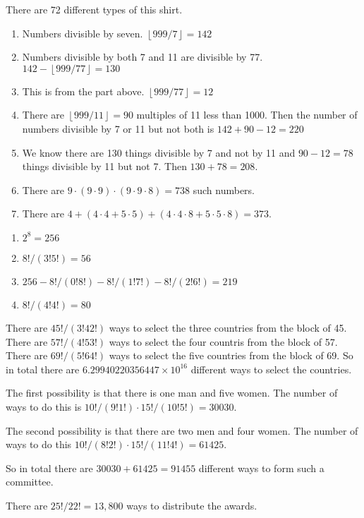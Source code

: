\documentclass[paper=a4, fontsize=11pt]{jhwhw} %
\begin{document}
\solution
There are 72 different types of this shirt.

\solution
\begin{enumerate}
    \item 
        Numbers divisible by seven. $\left \lfloor{999/7}\right \rfloor = 142$
    \item 
        Numbers divisible by both 7 and 11 are divisible by 77. $142 - \left \lfloor{999/77}\right \rfloor = 130$
    \item 
        This is from the part above. $\left \lfloor{999/77}\right \rfloor = 12$
    \item 
        There are $\left \lfloor{999/11}\right \rfloor = 90$ multiples of 11 less than 1000. Then the number of numbers divisible by 7 or 11 but not both is $142 + 90 - 12 = 220$
    \item 
        We know there are 130 things divisible by 7 and not by 11 and $90-12=78$ things divisible by 11 but not 7. Then $130+78=208$.
    \item There are $9\cdot (9\cdot9) \cdot (9\cdot 9\cdot 8) = 738$ such numbers.
    \item There are $4 + (4\cdot 4 + 5\cdot 5) + (4\cdot 4 \cdot 8 + 5\cdot 5\cdot 8) = 373$.
\end{enumerate}

\solution
\begin{enumerate}
    \item $2^8=256$
    \item $8!/(3!5!) = 56$
    \item $256 - 8!/(0!8!) - 8!/(1!7!) - 8!/(2!6!) = 219$
    \item $8!/(4!4!) = 80$
\end{enumerate}
\solution
There are $45!/(3!42!)$ ways to select the three countries from the block of 45. There are $57!/(4!53!)$ ways to select the four countris from the block of 57. There are $69!/(5!64!)$ ways to select the five countries from the block of 69. So in total there are $6.29940220356447 \times 10^{16}$ different ways to select the countries.

\solution
The first possibility is that there is one man and five women. The number of ways to do this is $10!/(9!1!) \cdot 15!/(10!5!) = 30030$. 

The second possibility is that there are two men and four women. The number of ways to do this $10!/(8!2!) \cdot 15!/(11!4!) = 61425$. 

So in total there are $30030 + 61425 = 91455$ different ways to form such a committee.

\solution
There are $25!/22! = 13,800$ ways to distribute the awards.
\end{document}
